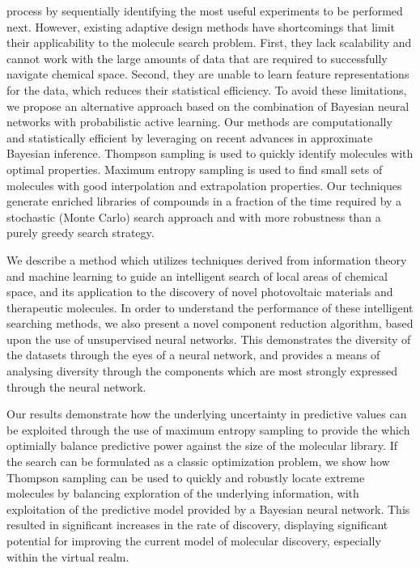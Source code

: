 process by sequentially identifying the most useful experiments to be performed
next. However, existing adaptive design methods have shortcomings that limit
their applicability to the molecule search problem. First, they lack
scalability and cannot work with the large amounts of data that are required to
successfully navigate chemical space. Second, they are unable to learn feature
representations for the data, which reduces their statistical efficiency. To
avoid these limitations, we propose an alternative approach based on the
combination of Bayesian neural networks with probabilistic active learning. Our
methods are computationally and statistically efficient by leveraging on recent
advances in approximate Bayesian inference. Thompson
sampling is used to quickly identify molecules with optimal properties.
Maximum entropy sampling is used
to find small sets of molecules with good interpolation and extrapolation properties.
Our techniques generate enriched libraries of compounds in a fraction
of the time required by a stochastic (Monte Carlo) search approach and with
more robustness than a purely greedy search strategy.

We describe a method which utilizes techniques derived from information theory and machine learning to guide an intelligent search of local areas of chemical space, and its application to the discovery of novel photovoltaic materials and therapeutic molecules.  In order to understand the performance of these intelligent searching methods, we also present a novel component reduction algorithm, based upon the use of unsupervised neural networks.  This demonstrates the diversity of the datasets through the eyes of a neural network, and provides a means of analysing diversity through the components which are most strongly expressed through the neural network.  

Our results demonstrate how the underlying uncertainty in predictive values can be exploited through the use of maximum entropy sampling to provide the which optimially balance predictive power against the size of the molecular library. If the search can be formulated as a classic optimization problem, we show how Thompson sampling can be used to quickly and robustly locate extreme molecules by balancing exploration of the underlying information, with exploitation of the predictive model provided by a Bayesian neural network. This resulted in significant increases in the rate of discovery, displaying significant potential for improving the current model of molecular discovery, especially within the virtual realm.
